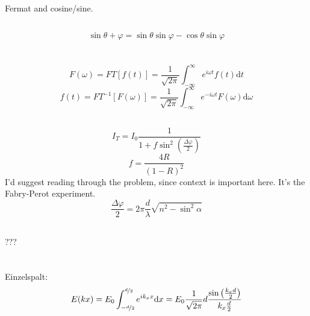 \documentclass[12pt]{report}
\newcommand{\vphi}{\varphi}
\newcommand{\dd}{\mathrm{d}}
\begin{document}
\subsection{}

Fermat and cosine/sine.

\subsection{}
\[\sin\theta+\vphi=\sin\theta\sin\vphi-\cos\theta\sin\vphi\]

\section{}

\subsection{}
\[F(\omega)=FT[f(t)]=\frac{1}{\sqrt{2\pi}}\int_{-\infty}^\infty e^{i\omega t}f(t)\dd t\]
\[f(t)=FT^{-1}[F(\omega)]=\frac{1}{\sqrt{2\pi}}\int_{-\infty}^\infty e^{-i\omega t}F(\omega)\dd\omega\]

\subsection{}

\[I_T=I_0\frac{1}{1+f\sin^2\left(\frac{\Delta\vphi}{2}\right)}\]
\[f=\frac{4R}{(1-R)^2}\]
I'd suggest reading through the problem, since context is important here. It's the Fabry-Perot experiment.
\[\frac{\Delta\vphi}{2}=2\pi\frac{d}{\lambda}\sqrt{n^2-\sin^2\alpha}\]

\subsection{}
???

\section{}

\subsection{}

Einzelspalt:
\[E(kx)=E_0\int_{-\nicefrac{d}{2}}^{\nicefrac{d}{2}}e^{ik_xx}\dd x=E_0\frac{1}{\sqrt{2\pi}}d\frac{\sin\left(\frac{k_xd}{2}\right)}{k_x\frac{d}{2}}\]

\subsection{}
\end{document}

